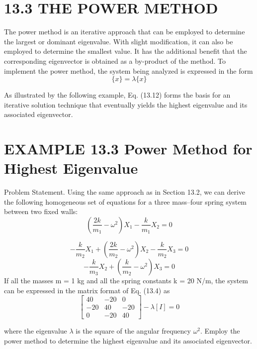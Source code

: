 \documentclass[../main.tex]{subfiles}
\begin{document}
\section*{13.3 THE POWER METHOD}
The power method is an iterative approach that can be employed to determine the largest
or dominant eigenvalue. With slight modification, it can also be employed to determine the
smallest value. It has the additional benefit that the corresponding eigenvector is obtained
as a by-product of the method. To implement the power method, the system being analyzed
is expressed in the form
\begin{equation}
[A]\{x\}=\lambda\{x\}\tag{13.12}
\end{equation}

As illustrated by the following example, Eq. (13.12) forms the basis for an iterative
solution technique that eventually yields the highest eigenvalue and its associated
eigenvector.


\section*{EXAMPLE 13.3 Power Method for Highest Eigenvalue}
Problem Statement. Using the same approach as in Section 13.2, we can derive the following homogeneous set of equations for a three mass–four spring system between two
fixed walls:
\begin{equation}
\left ( \frac{2k}{m_{1}}-\omega^{2}  \right )X_{1}    -\frac{k}{m_{1}}X_{2}=0
\end{equation}


\begin{equation}
-\frac{k}{m_{2}}X_{1}+\left ( \frac{2k}{m_{2}}-\omega ^{2} \right )X_{2}-\frac{k}{m_{2}}X_{3}=0
\end{equation}
\begin{equation}
-\frac{k}{m_{3}}X_{2}+\left ( \frac{k}{m_{2}}-\omega^{2} \right )X_{3}=0
\end{equation}
If all the masses m = 1 kg and all the spring constants k = 20 N/m, the system can be
expressed in the matrix format of Eq. (13.4) as
\begin{equation}
\begin{bmatrix}
40 & -20 & 0\\
-20 & 40 & -20\\
0 & -20 & 40
\end{bmatrix}
-\lambda [I]=0
\end{equation}


where the eigenvalue $\lambda$ is the square of the angular frequency $\omega^{2}$. Employ the power
method to determine the highest eigenvalue and its associated eigenvector.
\end{document}
